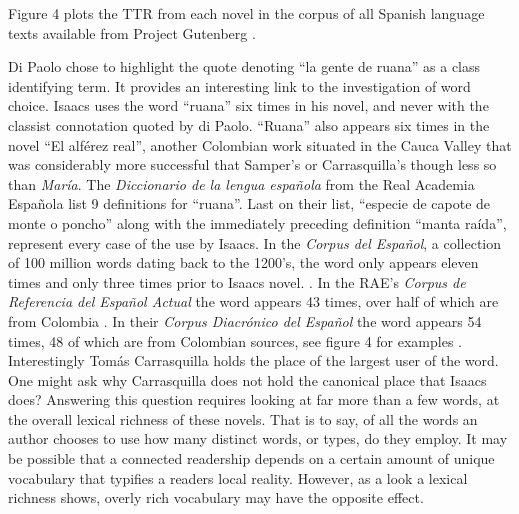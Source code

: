 \documentclass[12pt]{report}
\begin{document}
Figure 4 plots the TTR from each novel in the corpus of all Spanish language texts available from Project Gutenberg \autocite{Project G}.


Di Paolo chose to highlight the quote denoting \enquote{la gente de ruana} as a class identifying term. It provides an interesting link to the investigation of word choice.
Isaacs uses the word \enquote{ruana} six times in his novel, and never with the classist connotation quoted by di Paolo.
\enquote{Ruana} also appears six times in the novel \enquote{El alférez real}, another Colombian work situated in the Cauca Valley that was considerably more successful that Samper's or Carrasquilla's though less so than \textit{María}.
The \textit{Diccionario de la lengua española} from the Real Academia Española list 9 definitions for \enquote{ruana}.
Last on their list, \enquote{especie de capote de monte o poncho} along with the immediately preceding definition \enquote{manta raída}, represent every case of the use by Isaacs.
In the \textit{Corpus del Español}, a collection of 100 million words dating back to the 1200's, the word only appears eleven times and only three times prior to Isaacs novel. \autocite{Davies2012}. 
In the RAE's \textit{Corpus de Referencia del Español Actual} the word appears 43 times, over half of which are from Colombia \autocite{Crea}.
In their \textit{Corpus Diacrónico del Español} the word appears 54 times, 48 of which are from Colombian sources, see figure 4 for examples \autocite{Corde}.
Interestingly Tomás Carrasquilla holds the place of the largest user of the word.
One might ask why Carrasquilla does not hold the canonical place that Isaacs does?
Answering this question requires looking at far more than a few words, at the overall lexical richness of these novels.
That is to say, of all the words an author chooses to use how many distinct words, or types, do they employ.
It may be possible that a connected readership depends on a certain amount of unique vocabulary that typifies a readers local reality.
However, as a look a lexical richness shows, overly rich vocabulary may have the opposite effect. 
\end{document}
